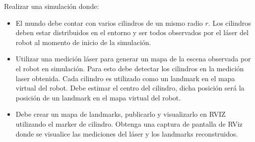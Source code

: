 \documentclass[tp]{lcc}
\begin{document}
\ejercicio Realizar una simulación donde:
\begin{itemize}
    \item El mundo debe contar con varios cilindros de un mismo radio $r$. Los cilindros deben estar distribuidos en el entorno y ser todos observados por el láser del robot al momento de inicio de la simulación.
    \item Utilizar una medición láser para generar un mapa de la escena observada por el robot en simulación. Para esto debe detectar los cilindros en la medición laser obtenida. Cada cilindro es utilizado como un landmark en el mapa virtual del robot. Debe estimar el centro del cilindro, dicha posición será la posición de un landmark en el mapa virtual del robot.
    \item Debe crear un mapa de landmarks, publicarlo y visualizarlo en RVIZ utilizando el marker de cilindro. Obtenga una captura de pantalla de RViz donde se visualice las mediciones del láser y los landmarks reconstruidos.
\end{itemize}





\printbibliography
\end{document}
